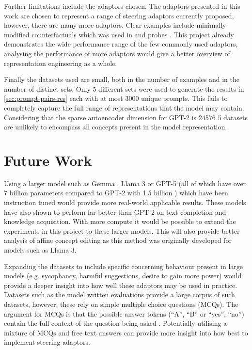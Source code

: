 Further limitations include the adaptors chosen.
The adaptors presented in this work are chosen to represent a range of steering adaptors currently proposed, however, there are many more adaptors.
Clear examples include minimally modified counterfactuals \citep{mimic} which was used in \citet{steering-clear} and probes \citep{probes}.
This project already demonstrates the wide performance range of the few commonly used adaptors, analysing the performance of more adaptors would give a better overview of representation engineering as a whole.

Finally the datasets used are small, both in the number of examples and in the number of distinct sets.
Only 5 different sets were used to generate the results in \cref{sec:prompt-pairs-res} each with at most 3000 unique prompts.
This fails to completely capture the full range of representations that the model may contain.
Considering that the sparse autoencoder dimension for GPT-2 is 24576 \citep{saelens} 5 datasets are unlikely to encompass all concepts present in the model representation.

\section{Future Work}

Using a larger model such as Gemma \citep{gemma}, Llama 3 \citep{llama3} or GPT-5 \citep{gpt-5} (all of which have over 7 billion parameters compared to GPT-2 with 1.5 billion \citep{gpt-2}) which have been instruction tuned would provide more real-world applicable results.
These models have also shown to perform far better than GPT-2 on text completion and knowledge acquisition.
With more compute it would be possible to extend the experiments in this project to these larger models.
This will also provide better analysis of affine concept editing \citep[ACE]{ace} as this method was originally developed for models such as Llama 3.

Expanding the datasets to include specific concerning behaviour present in large models (e.g. sycophancy, harmful suggestions, desire to gain more power) would provide a deeper insight into how well these adaptors may be used in practice.
Datasets such as the model written evaluations \citep[MWE]{mwe} provide a large corpus of such datasets, however, these rely on simple multiple choice questions (MCQs).
The argument for MCQs is that the possible answer tokens (``A'', ``B'' or ``yes'', ``no'') contain the full context of the question being asked \citep{steering-taxonomy}.
Potentially utilising a mixture of MCQs and free text answers can provide more insight into how best to implement steering adaptors.

